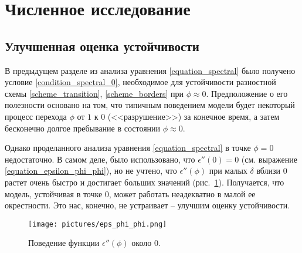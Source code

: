 \documentclass[a4paper,12pt]{article}
\theoremstyle{plain}
\theoremstyle{definition}
\begin{document}
\section{Численное исследование}
\label{section_computational_analysis}

\subsection{Улучшенная оценка устойчивости}

В предыдущем разделе из анализа уравнения \eqref{equation_spectral} было получено условие \eqref{condition_spectral_0}, необходимое для устойчивости разностной схемы \eqref{scheme_transition}, \eqref{scheme_borders} при $\phi \approx 0$. Предположение о его полезности основано на том, что типичным поведением модели будет некоторый процесс перехода $\phi$ от $1$ к $0$ (<<разрушение>>) за конечное время, а затем бесконечно долгое пребывание в состоянии $\phi \approx 0$.

Однако проделанного анализа уравнения \eqref{equation_spectral} в точке $\phi = 0$ недостаточно. В самом деле, было использовано, что $\epsilon''(0) = 0$ (см. выражение \eqref{equation_epsilon_phi_phi}), но не учтено, что $\epsilon''(\phi)$ при малых $\delta$ вблизи $0$ растет очень быстро и достигает больших значений (рис.~\ref{picture_eps_phi_phi}). Получается, что модель, устойчивая в точке $0$, может работать неадекватно в малой ее окрестности. Это нас, конечно, не устраивает -- улучшим оценку устойчивости.

\begin{figure}[!tp]
    \centering
    \texttt{[image: pictures/eps\_phi\_phi.png]}
    \vspace{-0.7cm}
    \caption{Поведение функции $\epsilon''(\phi)$ около $0$.}
    \label{picture_eps_phi_phi}
\end{figure}
\end{document}
